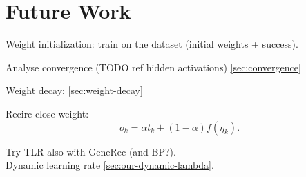 
\section*{Future Work} 
Weight initialization: train on the dataset (initial weights + success). 

Analyse convergence 
(TODO ref hidden activations) \ref{sec:convergence} 

Weight decay: 
\ref{sec:weight-decay} 

Recirc close weight: 
\begin{equation}
o_k = \alpha t_k + (1-\alpha)f(\eta_k). 
\end{equation} 

Try TLR also with GeneRec (and BP?).  \\ 


Dynamic learning rate \ref{sec:our-dynamic-lambda}. 
